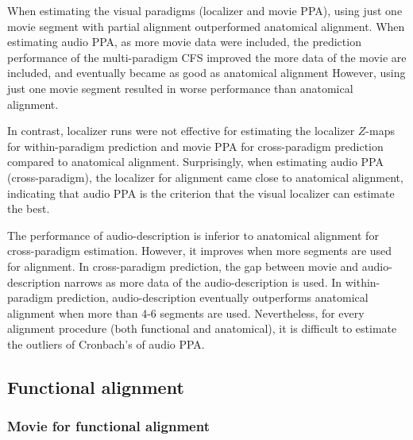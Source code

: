 

%
When estimating the visual paradigms (localizer and movie PPA), using just one
movie segment with partial alignment outperformed anatomical alignment.
%
When estimating audio PPA, as more movie data were included, the prediction
performance of the multi-paradigm CFS improved the more data of the movie are
included, and eventually became as good as anatomical alignment
%
However, using just one movie segment resulted in worse performance than
anatomical alignment.

%
In contrast, localizer runs were not effective for estimating the localizer
$Z$-maps for within-paradigm prediction and movie PPA for cross-paradigm
prediction compared to anatomical alignment.
%
Surprisingly, when estimating audio PPA (cross-paradigm), the localizer for
alignment came close to anatomical alignment, indicating that audio PPA is the
criterion that the visual localizer can estimate the best.


The performance of audio-description is inferior to anatomical alignment for
cross-paradigm estimation.
%
However, it improves when more segments are used for alignment.
%
In cross-paradigm prediction, the gap between movie and audio-description
narrows as more data of the audio-description is used.
%
In within-paradigm prediction, audio-description eventually outperforms
anatomical alignment when more than 4-6 segments are used.
%
Nevertheless, for every alignment procedure (both functional and anatomical), it
is difficult to estimate the outliers of Cronbach's of audio PPA.



\subsection{Functional alignment}




\subsubsection{Movie for functional alignment}



